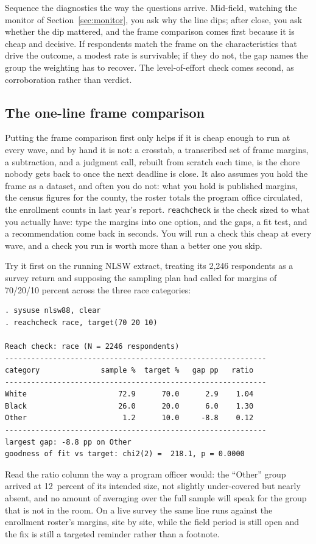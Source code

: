 \documentclass[
    a4paper,
    fontsize=10pt,
    twoside=true,
    numbers=noenddot,
]{kaobook}
\begin{document}
Sequence the diagnostics the way the questions arrive. Mid-field, watching the monitor of Section~\ref{sec:monitor}, you ask why the line dips; after close, you ask whether the dip mattered, and the frame comparison comes first because it is cheap and decisive. If respondents match the frame on the characteristics that drive the outcome, a modest rate is survivable; if they do not, the gap names the group the weighting has to recover. The level-of-effort check comes second, as corroboration rather than verdict.

\subsection{The one-line frame comparison}\label{sec:ch05-reach}
Putting the frame comparison first only helps if it is cheap enough to run at every wave, and by hand it is not: a crosstab, a transcribed set of frame margins, a subtraction, and a judgment call, rebuilt from scratch each time, is the chore nobody gets back to once the next deadline is close. It also assumes you hold the frame as a dataset, and often you do not: what you hold is published margins, the census figures for the county, the roster totals the program office circulated, the enrollment counts in last year's report. \texttt{reachcheck} is the check sized to what you actually have: type the margins into one option, and the gaps, a fit test, and a recommendation come back in seconds. You will run a check this cheap at every wave, and a check you run is worth more than a better one you skip.

Try it first on the running NLSW extract, treating its 2{,}246 respondents as a survey return and supposing the sampling plan had called for margins of 70/20/10 percent across the three race categories:
\par
{\footnotesize
\begin{verbatim}
. sysuse nlsw88, clear
. reachcheck race, target(70 20 10)

Reach check: race (N = 2246 respondents)
------------------------------------------------------------
category              sample %  target %   gap pp   ratio
------------------------------------------------------------
White                     72.9      70.0      2.9    1.04
Black                     26.0      20.0      6.0    1.30
Other                      1.2      10.0     -8.8    0.12
------------------------------------------------------------
largest gap: -8.8 pp on Other
goodness of fit vs target: chi2(2) =  218.1, p = 0.0000
\end{verbatim}
}
Read the ratio column the way a program officer would: the \enquote{Other} group arrived at 12~percent of its intended size, not slightly under-covered but nearly absent, and no amount of averaging over the full sample will speak for the group that is not in the room. On a live survey the same line runs against the enrollment roster's margins, site by site, while the field period is still open and the fix is still a targeted reminder rather than a footnote.
\end{document}
